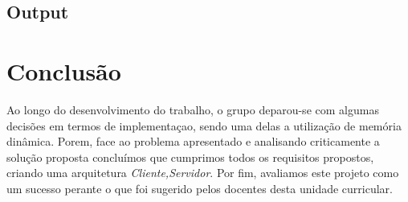 \documentclass[a4paper]{report}
\begin{document}
\hypertarget{Output}{}
\section{Output}



\chapter{Conclusão}\label{chap:Conclusão}
Ao longo do desenvolvimento do trabalho, o grupo deparou-se com algumas decisões em termos de implementaçao, sendo uma delas a utilização de memória dinâmica.
Porem, face ao problema apresentado e analisando criticamente a solução proposta concluímos que cumprimos todos os requisitos propostos, criando uma arquitetura \textit{Cliente,Servidor}. 
Por fim, avaliamos este projeto como um sucesso perante o que foi sugerido pelos docentes desta unidade curricular.
\end{document}
